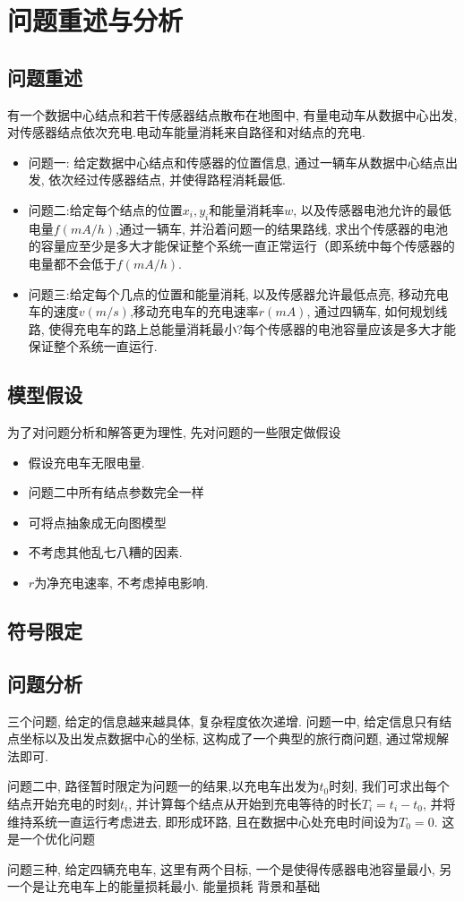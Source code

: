 \section{问题重述与分析}
	\subsection{问题重述}
	有一个数据中心结点和若干传感器结点散布在地图中, 有量电动车从数据中心出发, 对传感器结点依次充电.电动车能量消耗来自路径和对结点的充电.
	\begin{itemize}
		\item 问题一: 给定数据中心结点和传感器的位置信息, 通过一辆车从数据中心结点出发, 依次经过传感器结点, 并使得路程消耗最低.
		\item 问题二:给定每个结点的位置$x_i,y_i$和能量消耗率$w$, 以及传感器电池允许的最低电量$f(mA/h)$,通过一辆车, 并沿着问题一的结果路线, 求出个传感器的电池的容量应至少是多大才能保证整个系统一直正常运行（即系统中每个传感器的电量都不会低于$f(mA/h)$.
		\item 问题三:给定每个几点的位置和能量消耗, 以及传感器允许最低点亮, 移动充电车的速度$v(m/s)$,移动充电车的充电速率$r(mA)$, 通过四辆车, 如何规划线路, 使得充电车的路上总能量消耗最小?每个传感器的电池容量应该是多大才能保证整个系统一直运行.
	\end{itemize}
	
	
	

	\subsection{模型假设}
	为了对问题分析和解答更为理性, 先对问题的一些限定做假设
	\begin{itemize}
		\item 假设充电车无限电量.
		\item 问题二中所有结点参数完全一样
		\item 可将点抽象成无向图模型
		\item 不考虑其他乱七八糟的因素.
		\item $r$为净充电速率, 不考虑掉电影响.
	\end{itemize}


	\subsection{符号限定}

	



	\subsection{问题分析}
		三个问题, 给定的信息越来越具体, 复杂程度依次递增. 
		问题一中, 给定信息只有结点坐标以及出发点数据中心的坐标, 这构成了一个典型的旅行商问题, 通过常规解法即可.

		问题二中, 路径暂时限定为问题一的结果,以充电车出发为$t_0$时刻, 我们可求出每个结点开始充电的时刻$t_i$, 并计算每个结点从开始到充电等待的时长$T_i = t_i - t_0$, 并将维持系统一直运行考虑进去, 即形成环路, 且在数据中心处充电时间设为$T_0 = 0$. 这是一个优化问题%

		问题三种, 给定四辆充电车, 这里有两个目标, 一个是使得传感器电池容量最小, 另一个是让充电车上的能量损耗最小.  能量损耗
	背景和基础
		






